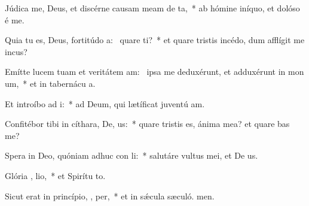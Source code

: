 \item Júdica me, Deus, et discérne causam meam de   ta,~* ab hómine iníquo, et dolóso é me.
\item Quia tu es, Deus, fortitúdo a:~\pscross{} quare  ti?~* et quare tristis incédo, dum afflígit me incus?
\item Emítte lucem tuam et veritátem am:~\pscross{} ipsa me deduxérunt, et adduxérunt in mon  um,~* et in tabernácu a.
\item Et introíbo ad  i:~* ad Deum, qui lætíficat juventú am.
\item Confitébor tibi in cíthara, De,  us:~* quare tristis es, ánima mea? et quare bas me?
\item Spera in Deo, quóniam adhuc con li:~* salutáre vultus mei, et De us.
\item Glória ,  lio,~* et Spirítu to.
\item Sicut erat in princípio,  ,  per,~* et in sǽcula sæculó. men.
